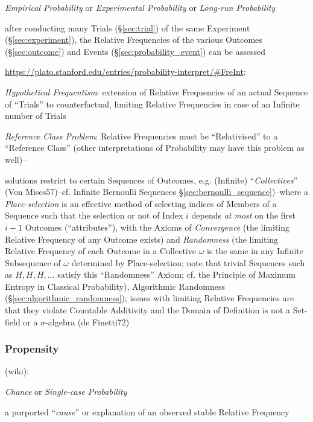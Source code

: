 \emph{Empirical Probability} or \emph{Experimental Probability} or
\emph{Long-run Probability}

after conducting many Trials (\S\ref{sec:trial}) of the same Experiment
(\S\ref{sec:experiment}), the Relative Frequencies of the various Outcomes
(\S\ref{sec:outcome}) and Events (\S\ref{sec:probability_event}) can be assessed

\url{https://plato.stanford.edu/entries/probability-interpret/#FreInt}:

\emph{Hypothetical Frequentism}: extension of Relative Frequencies of an actual
Sequence of ``Trials'' to counterfactual, limiting Relative Frequencies in case
of an Infinite number of Trials

\emph{Reference Class Problem}: Relative Frequencies must be ``Relativised'' to
a ``Reference Class'' (other interpretations of Probability may have this
problem as well)--

solutions restrict to certain Sequences of Outcomes, e.g. (Infinite)
``\emph{Collectives}'' (Von Mises57)--cf. Infinite Bernoulli Sequences
\S\ref{sec:bernoulli_sequence})--where a \emph{Place-selection} is an effective
method of selecting indices of Members of a Sequence such that the selection or
not of Index $i$ depends \emph{at most} on the first $i-1$ Outcomes
(``attributes''), with the Axioms of \emph{Convergence} (the limiting Relative
Frequency of any Outcome exists) and \emph{Randomness} (the limiting Relative
Frequency of each Outcome in a Collective $\omega$ is the same in any Infinite
Subsequence of $\omega$ determined by Place-selection; note that trivial
Sequences such as $H,H,H,\ldots$ satisfy this ``Randomness'' Axiom; cf. the
Principle of Maximum Entropy in Classical Probability), Algorithmic Randomness
(\S\ref{sec:algorithmic_randomness});
issues with limiting Relative Frequencies are that they violate Countable
Additivity and the Domain of Definition is not a Set-field or a $\sigma$-algebra
(de Finetti72)



\subsubsection{Propensity}\label{sec:propensity}

(wiki):

\emph{Chance} or \emph{Single-case Probability}

a purported ``\emph{cause}'' or explanation of an observed stable Relative
Frequency

